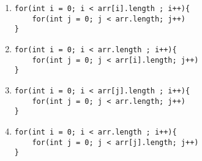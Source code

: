 \documentclass[CS180-S16-FinalExam.tex]{subfiles}
\begin{document}
\begin{enumerate}
\begin{enumerate}
\item \begin{lstlisting}
for(int i = 0; i < arr[i].length ; i++){
	for(int j = 0; j < arr.length; j++)
}
\end{lstlisting}

\item  \ifdraft \Ans \fi
\begin{lstlisting}
for(int i = 0; i < arr.length ; i++){
	for(int j = 0; j < arr[i].length; j++)
}
\end{lstlisting} 

\item  \begin{lstlisting}
for(int i = 0; i < arr[j].length ; i++){
	for(int j = 0; j < arr.length; j++)
}
\end{lstlisting}

\item \begin{lstlisting}
for(int i = 0; i < arr.length ; i++){
	for(int j = 0; j < arr[j].length; j++)
}
\end{lstlisting}
\end{enumerate}





\end{enumerate}
\end{document}
